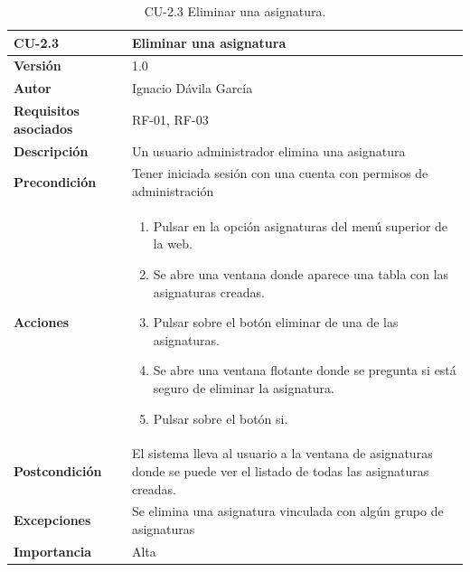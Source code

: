 \begin{table}[p]
	\centering
	\begin{tabularx}{\linewidth}{ p{} p{} }
		\toprule
		\textbf{CU-2.3}    & \textbf{Eliminar una asignatura}\\
		\toprule
		\textbf{Versión}              & 1.0    \\
		\textbf{Autor}                & Ignacio Dávila García \\
		\textbf{Requisitos asociados} & RF-01, RF-03 \\
		\textbf{Descripción}          & Un usuario administrador elimina una asignatura \\
		\textbf{Precondición}         & Tener iniciada sesión con una cuenta con permisos de administración \\
		\textbf{Acciones}             &
		\begin{enumerate}
			\def\labelenumi{\arabic{enumi}.}
			\tightlist
			\item Pulsar en la opción asignaturas del menú superior de la web.
			\item Se abre una ventana donde aparece una tabla con las asignaturas creadas.
			\item Pulsar sobre el botón eliminar de una de las asignaturas.
			\item Se abre una ventana flotante donde se pregunta si está seguro de eliminar la asignatura.
			\item Pulsar sobre el botón si.
		\end{enumerate}\\
		\textbf{Postcondición}        & El sistema lleva al usuario a la ventana de asignaturas donde se puede ver el listado de todas las asignaturas creadas. \\
		\textbf{Excepciones}          & Se elimina una asignatura vinculada con algún grupo de asignaturas \\
		\textbf{Importancia}          & Alta \\
		\bottomrule
	\end{tabularx}
	\caption{CU-2.3 Eliminar una asignatura.}
\end{table}

